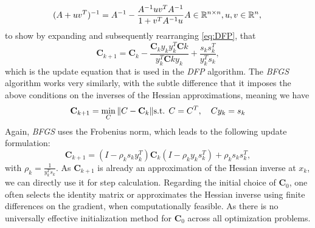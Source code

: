 \begin{equation}
    (A + uv^T)^{-1} = A^{-1} - \frac{A^{-1}uv^T A^{-1}}{1 + v^T A^{-1}u} \\ A \in \mathbb{R}^{n \times n},\\
    u, v \in \mathbb{R}^n,\\
\end{equation}
    to show by expanding and subsequently rearranging \ref{eq:DFP}, that
\begin{equation}
\mathbf{C}_{k+1} = \mathbf{C}_k - \frac{\mathbf{C}_k y_k y_k^T \mathbf{C}k}{y_k^T \mathbf{C}k y_k} + \frac{s_k s_k^T}{y_k^T s_k},
\end{equation}
which is the update equation that is used in the \emph{DFP} algorithm.
The \emph{BFGS} algorithm works very similarly, with the subtle difference that it imposes the above conditions on the inverses of the Hessian approximations, meaning we have
\begin{equation}
\mathbf{C}_{k+1} = \min_{C} \|C - \mathbf{C}_k\| \\\text{s.t. } C = C^T, \quad Cy_k = s_k
\end{equation}
Again, \emph{BFGS} uses the Frobenius norm, which leads to the following update formulation:
\begin{equation}
\mathbf{C}_{k+1} = (I - \rho_k s_k y_k^T)  \mathbf{C}_k(I - \rho_k y_k s_k^T) + \rho_k s_k s_k^T,
\end{equation}
with $\rho_k = \frac{1}{y_k^T s_k}$. As $\mathbf{C}_{k+1}$ is already an approximation of the Hessian inverse at 
$x_k$, we can directly use it for step calculation. Regarding the initial choice of $\mathbf{C}_0$, one often selects the identity matrix
or approximates the Hessian inverse using finite differences on the gradient, when computationally feasible.
As there is no universally effective initialization method for $\mathbf{C}_0$ across all optimization problems.


